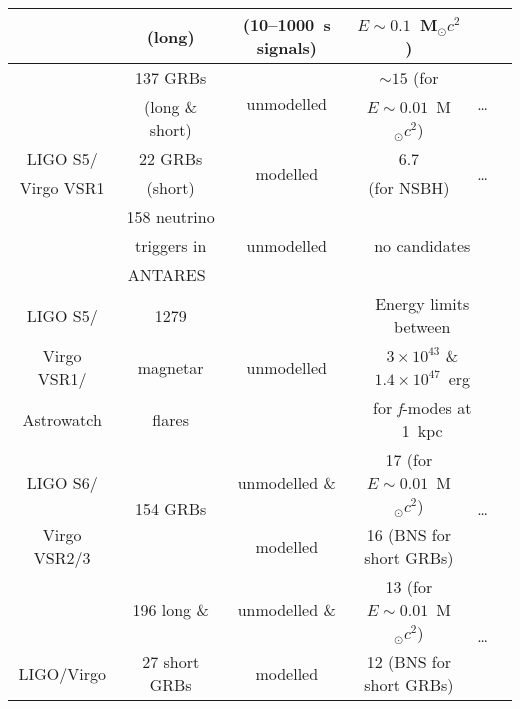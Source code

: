 \begin{longtable}{c|ccccc}
 & (long)  & (10--1000~s signals) &  $E \sim 0.1$~M$_{\odot}c^2$) &                         & \\
\hline
           & 137 GRBs        & \multirow{2}{*}{unmodelled} & $\sim 15$ (for                & \multirow{2}{*}{\ldots} & \multirow{2}{*}{\cite{Abbott:2009d}} \\
           & (long \& short) &                             & $E \sim 0.01$~M$_{\odot}c^2$) &                         & \\
\cline{2-6}
LIGO S5/   & 22 GRBs         & \multirow{2}{*}{modelled}   & 6.7        & \multirow{2}{*}{\ldots} & \multirow{2}{*}{\cite{Abadie:2010b}} \\
Virgo VSR1 & (short)         &                             & (for NSBH) &                         & \\
\cline{2-6}
           & 158 neutrino                       & \multirow{3}{*}{unmodelled} & \multicolumn{2}{c}{\multirow{3}{*}{no candidates}} & \multirow{3}{*}{\cite{2013JCAP...06..008A}} \\
           & triggers in                        &                             &                                                    & \\
           & ANTARES~\cite{2011NIMPA.656...11A} &                             &                                                    & \\
\hline
LIGO S5/    & 1279     & \multirow{3}{*}{unmodelled} & \multicolumn{2}{c}{Energy limits between}         & \multirow{3}{*}{\cite{Abadie:2010c}} \\
Virgo VSR1/ & magnetar &                             & \multicolumn{2}{c}{$3\!\times\!10^{43}$ \& $1.4\!\times\!10^{47}$~erg} & \\
Astrowatch  & flares   &                             & \multicolumn{2}{c}{for \textit{f}-modes at 1~kpc} & \\
\hline
LIGO S6/     & \multirow{2}{*}{154 GRBs} & unmodelled \& & 17 (for $E \sim 0.01$~M$_{\odot}c^2$) & \multirow{2}{*}{\ldots} & 
\multirow{2}{*}{\cite{2012ApJ...760...12A}} \\
Virgo VSR2/3 &                           & modelled      & 16 (BNS for short GRBs)               &                          &  \\
\hline
           & 196 long \&   & unmodelled \& & 13 (for $E \sim 0.01$~M$_{\odot}c^2$) & \multirow{2}{*}{\ldots} & \multirow{2}{*}{\cite{2014PhRvL.113a1102A}} \\
LIGO/Virgo & 27 short GRBs & modelled      & 12 (BNS for short GRBs)               &                         & \\

\end{longtable}
